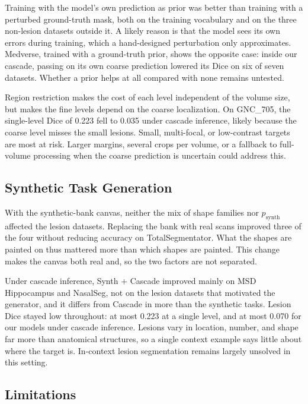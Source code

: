 \documentclass[hidelinks, a4paper, 12pt, ngerman, english]{article}  %
\begin{document}
Training with the model's own prediction as prior was better than training
with a perturbed ground-truth mask, both on the training vocabulary and on the
three non-lesion datasets outside it. A likely reason is that the model sees
its own errors during training, which a hand-designed perturbation only
approximates. Medverse, trained with a ground-truth prior, shows the opposite
case: inside our cascade, passing on its own coarse prediction lowered its
Dice on six of seven datasets. Whether a prior helps at all compared with none
remains untested.

Region restriction makes the cost of each level independent of the volume
size, but makes the fine levels depend on the coarse localization. On
GNC\_705, the single-level Dice of 0.223 fell to 0.035 under cascade
inference, likely because the coarse level misses the small lesions. Small,
multi-focal, or low-contrast targets are most at risk. Larger margins, several
crops per volume, or a fallback to full-volume processing when the coarse
prediction is uncertain could address this.

\subsection{Synthetic Task Generation}\label{sec:discussion-synth}

With the synthetic-bank canvas, neither the mix of shape families nor
$p_\text{synth}$ affected the lesion datasets. Replacing the bank with real scans improved three of the four without reducing accuracy on
TotalSegmentator. What the shapes are painted on thus mattered more than which
shapes are painted. This change makes the canvas both real and, so the
two factors are not separated.

Under cascade inference, Synth + Cascade improved mainly on MSD Hippocampus
and NasalSeg, not on the lesion datasets that motivated the generator, and it
differs from Cascade in more than the synthetic tasks. Lesion Dice stayed low
throughout: at most 0.223 at a single level, and at most 0.070 for our models
under cascade inference. Lesions vary in location, number, and shape far more
than anatomical structures, so a single context example says little about
where the target is. In-context lesion segmentation remains largely unsolved
in this setting.

\subsection{Limitations}\label{sec:discussion-limitations}
\end{document}
